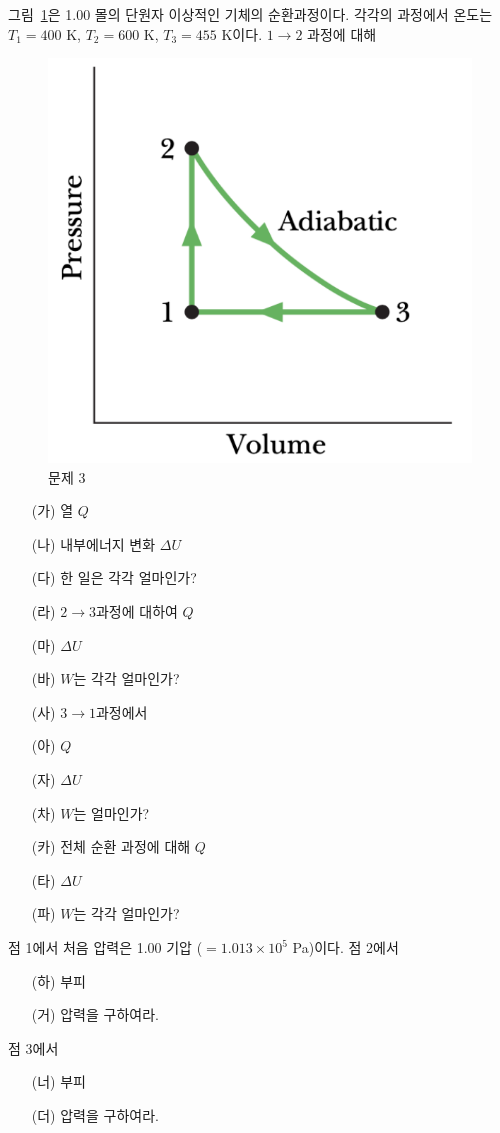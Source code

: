 \documentclass[floatfix,nofootinbib,superscriptaddress,fleqn]{revtex4}
\begin{document}
\vspace{1cm}

그림~\ref{fig:1}은 1.00 몰의 단원자
이상적인 기체의 순환과정이다.  각각의 과정에서 온도는 $T_1=400$ K,
$T_2=600$ K, $T_3=455$ K이다.  $1\to 2$ 과정에 대해
\begin{figure}[ht]
  \centering
  \includegraphics[scale=0.6]{Qfig23-1.pdf}
  \caption{문제 3}
  \label{fig:1}
\end{figure}
\begin{itemize}
\item[(가)] 열 $Q$
\item[(나)] 내부에너지 변화 $\Delta U$
\item[(다)] 한 일은 각각 얼마인가? 
\item[(라)] $2\to 3$과정에 대하여 $Q$
\item[(마)] $\Delta U$
\item[(바)] $W$는 각각 얼마인가? 
\item[(사)] $3\to 1$과정에서 
\item[(아)] $Q$
\item[(자)] $\Delta U$
\item[(차)] $W$는 얼마인가?
\item[(카)] 전체 순환 과정에 대해 $Q$
\item[(타)] $\Delta U$
\item[(파)] $W$는 각각 얼마인가?
\end{itemize}
점 1에서 처음 압력은 1.00 기압 ($=1.013\times 10^5$ Pa)이다. 점 2에서
\begin{itemize}
\item[(하)] 부피 
\item[(거)] 압력을 구하여라. 
\end{itemize}
점 3에서 
\begin{itemize}
\item[(너)] 부피 
\item[(더)] 압력을 구하여라. 
\end{itemize}
\vspace{1cm}
\end{document}
